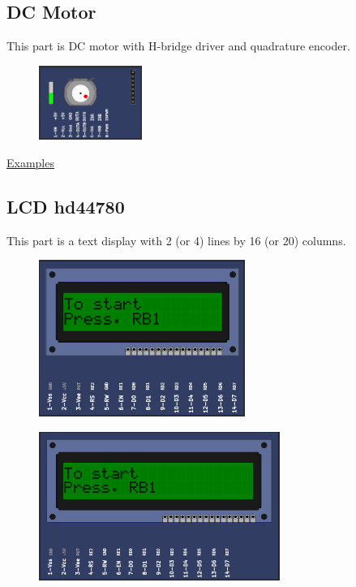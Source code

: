 \subsection{DC Motor}

This part is DC motor with H-bridge driver and quadrature encoder. 

\begin{figure}[H]
\center
\includegraphics[width=0.3\textwidth]{img/part_dcmotor.png} 
\end{figure} 

\href{https://lcgamboa.github.io/picsimlab_examples/Parts.html\#DC_Motor}{Examples}


\subsection{LCD hd44780}

This part is a text display with 2 (or 4) lines by 16 (or 20) columns.

\begin{figure}[H]
\center
\includegraphics[width=0.6\textwidth]{img/part_hd44780_2x16.png} 
\end{figure} 

\begin{figure}[H]
\center
\includegraphics[width=0.7\textwidth]{img/part_hd44780_2x20.png} 
\end{figure} 

